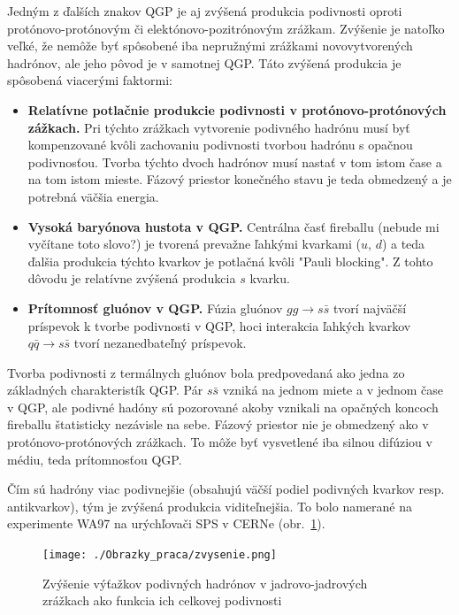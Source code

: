\documentclass[thesismargins, thesislinespacing]{rnthesis}
\begin{document}
Jedným z ďalších znakov QGP je aj zvýšená produkcia podivnosti oproti protónovo-protónovým či elektónovo-pozitrónovým zrážkam. Zvýšenie je natoľko veľké, že nemôže byť spôsobené iba nepružnými zrážkami novovytvorených hadrónov, ale jeho pôvod je v samotnej QGP. Táto zvýšená produkcia je spôsobená viacerými faktormi:
\begin{itemize}
	\item \textbf{Relatívne potlačnie produkcie podivnosti v protónovo-protónových zážkach.} Pri týchto zrážkach vytvorenie podivného hadrónu musí byť kompenzované kvôli zachovaniu podivnosti tvorbou hadrónu s opačnou podivnosťou. Tvorba týchto dvoch hadrónov musí nastať v tom istom čase a na tom istom mieste.  Fázový priestor konečného stavu je teda obmedzený a je potrebná väčšia energia.
	\item \textbf{Vysoká baryónova hustota v QGP.} Centrálna časť fireballu (nebude mi vyčítane toto slovo?) je tvorená prevažne ľahkými kvarkami ($u$, $d$) a teda ďalšia produkcia týchto kvarkov je potlačná kvôli  "Pauli blocking". Z tohto dôvodu je relatívne zvýšená produkcia $s$ kvarku.
	\item \textbf{Prítomnosť gluónov v QGP.} Fúzia gluónov $gg\rightarrow s \bar{s}$ tvorí najväčší príspevok k tvorbe podivnosti v QGP, hoci interakcia ľahkých kvarkov $q \bar{q} \rightarrow s \bar{s}$ tvorí nezanedbateľný príspevok.
\end{itemize}

Tvorba podivnosti z termálnych gluónov bola predpovedaná ako jedna zo \-zák\-lad\-ných charakteristík QGP. Pár $s \bar{s}$ vzniká na jednom miete a v jednom čase v QGP, ale podivné hadóny sú pozorované akoby vznikali na opačných koncoch fireballu štatisticky nezávisle na sebe. Fázový priestor nie je obmedzený ako v protónovo-protónových zrážkach. To môže byť vysvetlené iba silnou difúziou v médiu, teda prítomnosťou QGP.

Čím sú hadróny viac podivnejšie (obsahujú väčší podiel podivných kvarkov resp. antikvarkov), tým je zvýšená produkcia viditeľnejšia. To bolo namerané na experimente WA97 na urýchľovači SPS v CERNe (obr.~\ref{zvysenie}).


\begin{figure}[hbtp!]
	\begin{center}
		\texttt{[image: ./Obrazky\_praca/zvysenie.png]}
		\caption{ Zvýšenie výťažkov podivných hadrónov v jadrovo-jadrových zrážkach ako funkcia ich celkovej podivnosti \cite{zvysenie}}
		\label{zvysenie}
	\end{center}
\end{figure}  
\end{document}
